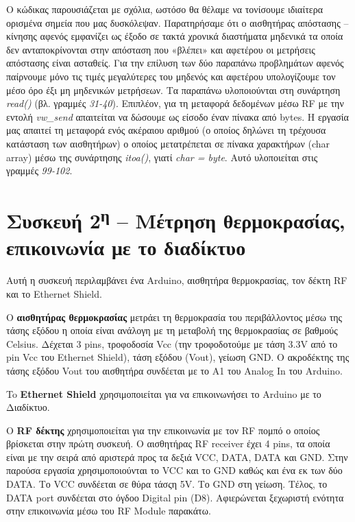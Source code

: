 \documentclass[twoside,a4paper]{article}
\begin{document}
 \begin{flushleft}
 \par Ο κώδικας παρουσιάζεται με σχόλια, ωστόσο θα θέλαμε να τονίσουμε ιδιαίτερα ορισμένα σημεία που μας δυσκόλεψαν.
Παρατηρήσαμε ότι ο αισθητήρας απόστασης – κίνησης αφενός εμφανίζει ως έξοδο σε τακτά χρονικά διαστήματα μηδενικά τα οποία δεν ανταποκρίνονται στην απόσταση που «βλέπει» και αφετέρου οι μετρήσεις απόστασης είναι ασταθείς. Για την επίλυση των δύο παραπάνω προβλημάτων αφενός παίρνουμε μόνο τις τιμές μεγαλύτερες του μηδενός και αφετέρου υπολογίζουμε τον μέσο όρο έξι μη μηδενικών μετρήσεων. Τα παραπάνω υλοποιούνται στη συνάρτηση \textit{read()} (βλ. γραμμές \textit{31-40}). 
Επιπλέον, για τη μεταφορά δεδομένων μέσω RF με την εντολή \textit{vw\_send} απαιτείται να δώσουμε ως είσοδο έναν πίνακα από bytes. Η εργασία μας απαιτεί τη μεταφορά ενός ακέραιου αριθμού (ο οποίος δηλώνει τη τρέχουσα κατάσταση των αισθητήρων) ο οποίος μετατρέπεται σε πίνακα χαρακτήρων (char array) μέσω της συνάρτησης \textit{itoa()}, γιατί \textit{char = byte}. Αυτό υλοποιείται στις γραμμές \textit{99-102}.


\section{Συσκευή 2\textsuperscript{η} – Μέτρηση θερμοκρασίας, επικοινωνία με το διαδίκτυο }

\par Αυτή η συσκευή περιλαμβάνει ένα Arduino, αισθητήρα θερμοκρασίας, τον δέκτη RF και το Ethernet Shield.
\par O \textbf{αισθητήρας θερμοκρασίας} μετράει τη θερμοκρασία του περιβάλλοντος μέσω της τάσης εξόδου η οποία είναι ανάλογη με τη μεταβολή της θερμοκρασίας σε βαθμούς Celsius. Δέχεται 3 pins, τροφοδοσία Vcc (την τροφοδοτούμε με τάση 3.3V από το pin Vcc του  Ethernet Shield), τάση εξόδου (Vout), γείωση GND.  Ο ακροδέκτης της τάσης εξόδου Vout του αισθητήρα συνδέεται με το A1 του Analog In του Arduino.
\par To \textbf{Ethernet Shield} χρησιμοποιείται για να επικοινωνήσει το Arduino με το Διαδίκτυο. 
\par O \textbf{RF δέκτης} χρησιμοποιείται για την επικοινωνία με τον RF πομπό ο οποίος βρίσκεται στην πρώτη συσκευή. O αισθητήρας RF receiver έχει 4 pins, τα οποία είναι με την σειρά από αριστερά προς τα δεξιά VCC, DATA, DATA και GND. Στην παρούσα εργασία χρησιμοποιούνται το  VCC και το GND καθώς και ένα εκ των δύο DATA. Το VCC συνδέεται σε θύρα τάσςη 5V. Το GND στη γείωση. Τέλος, το DATA port συνδέεται στο όγδοο Digital pin (D8). Αφιερώνεται ξεχωριστή ενότητα στην επικοινωνία μέσω του RF Module παρακάτω.
 \end{flushleft}
\end{document}
